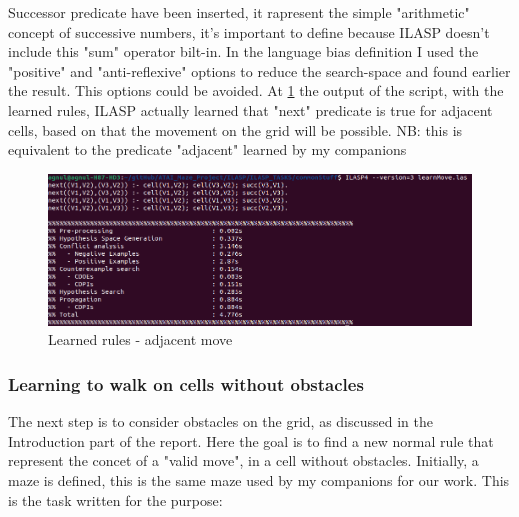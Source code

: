 Successor predicate have been inserted, it rapresent the simple "arithmetic" concept of successive numbers, it's important to define because ILASP doesn't include this "sum" operator bilt-in.
In the language bias definition I used the "positive" and "anti-reflexive" options to reduce the search-space and found earlier the result. This options could be avoided.
At \ref{fig:asd} the output of the script, with the learned rules, ILASP actually learned that "next" predicate is true for adjacent cells, based on that the movement on the grid will be possible.
NB: this is equivalent to the predicate "adjacent" learned by my companions
\begin{figure}
	\centering
	\includegraphics[scale=0.5]{img/learnMoveAdj.png}
	\caption{Learned rules - adjacent move}\label{fig:asd}
\end{figure}

\newpage
\subsubsection{Learning to walk on cells without obstacles}
The next step is to consider obstacles on the grid, as discussed in the Introduction part of the report. Here the goal is to find a new normal rule that represent the concet of a "valid move", in a cell without obstacles.
Initially, a maze is defined, this is the same maze used by my companions for our work.
This is the task written for the purpose:
\newpage

